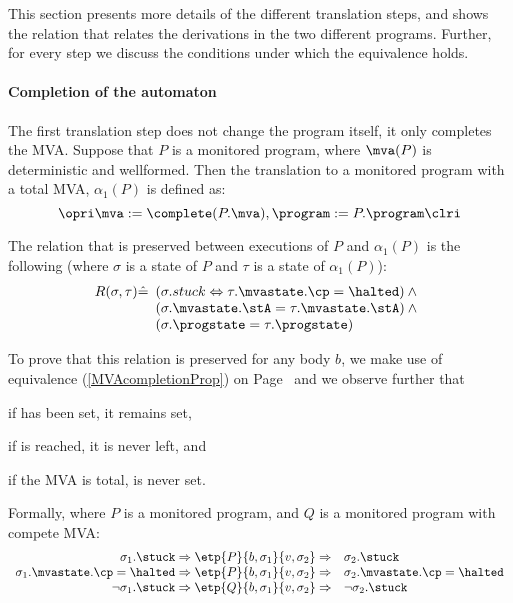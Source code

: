 This section presents more details of the different translation steps,
and shows the relation that relates the derivations in the two
different programs. Further, for every step we discuss the conditions
under which the equivalence holds.



\paragraph{Completion of the automaton}
The first translation step does not change the program itself, it only
completes the MVA. Suppose that \(P\) is a monitored program, where
\(\mva(P)\) is deterministic and wellformed. Then the translation to a
monitored program with a total MVA, \(\alpha_1(P)\) is defined as:
\[
\opri \mva := \complete(P.\mva), \program := P.\program \clri
\]

The relation that is preserved between executions of \(P\) and
\(\alpha_1(P)\) is the following (where \(\sigma\) is a state of
\(P\) and \(\tau\) is a state of \(\alpha_1(P)\)):
\[R(\sigma, \tau) \hat=
 \begin{array}[t]{l}
  (\sigma.stuck \Leftrightarrow \tau.\mvastate.\cp = \halted) \:\wedge \\
  (\sigma.\mvastate.\stA = \tau.\mvastate.\stA) \:\wedge \\
  (\sigma.\progstate = \tau.\progstate)
\end{array}
\]

To prove that this relation is preserved for any body \(b\), we make
use of equivalence (\ref{MVAcompletionProp}) on
Page~\pageref{MVAcompletionProp} and we observe further that
\begin{inparaenum}
\item if \stuck has been set, it remains set,
\item if \halted is reached, it is never left, and
\item if the MVA is total, \stuck is never set.
\end{inparaenum} Formally, where \(P\) is a monitored program, and
\(Q\) is a monitored program with compete MVA:
\[
\begin{array}[t]{rl}
\sigma_1.\stuck \Rightarrow
\etp{P}{b,\sigma_1}{v,\sigma_2} \Rightarrow &
\sigma_2.\stuck \\
\sigma_1.\mvastate.\cp = \halted \Rightarrow
\etp{P}{b,\sigma_1}{v,\sigma_2} \Rightarrow &
\sigma_2.\mvastate.\cp = \halted \\
\neg \sigma_1.\stuck \Rightarrow
\etp{Q}{b,\sigma_1}{v,\sigma_2} \Rightarrow &
\neg \sigma_2.\stuck
\end{array}
\]

